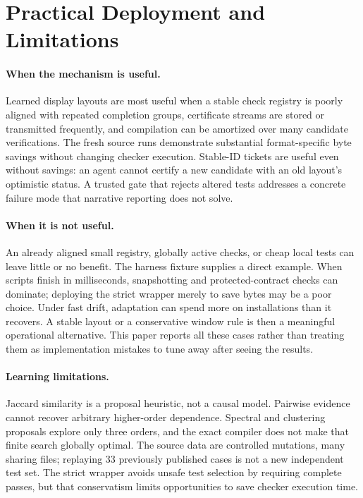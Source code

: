 \section{Practical Deployment and Limitations}\label{sec:limits}
\paragraph{When the mechanism is useful.}
Learned display layouts are most useful when a stable check registry is poorly aligned with repeated completion groups, certificate streams are stored or transmitted frequently, and compilation can be amortized over many candidate verifications. The fresh source runs demonstrate substantial format-specific byte savings without changing checker execution. Stable-ID tickets are useful even without savings: an agent cannot certify a new candidate with an old layout's optimistic status. A trusted gate that rejects altered tests addresses a concrete failure mode that narrative reporting does not solve.

\paragraph{When it is not useful.}
An already aligned small registry, globally active checks, or cheap local tests can leave little or no benefit. The harness fixture supplies a direct example. When scripts finish in milliseconds, snapshotting and protected-contract checks can dominate; deploying the strict wrapper merely to save bytes may be a poor choice. Under fast drift, adaptation can spend more on installations than it recovers. A stable layout or a conservative window rule is then a meaningful operational alternative. This paper reports all these cases rather than treating them as implementation mistakes to tune away after seeing the results.

\paragraph{Learning limitations.}
Jaccard similarity is a proposal heuristic, not a causal model. Pairwise evidence cannot recover arbitrary higher-order dependence. Spectral and clustering proposals explore only three orders, and the exact compiler does not make that finite search globally optimal. The source data are controlled mutations, many sharing files; replaying 33 previously published cases is not a new independent test set. The strict wrapper avoids unsafe test selection by requiring complete passes, but that conservatism limits opportunities to save checker execution time.

